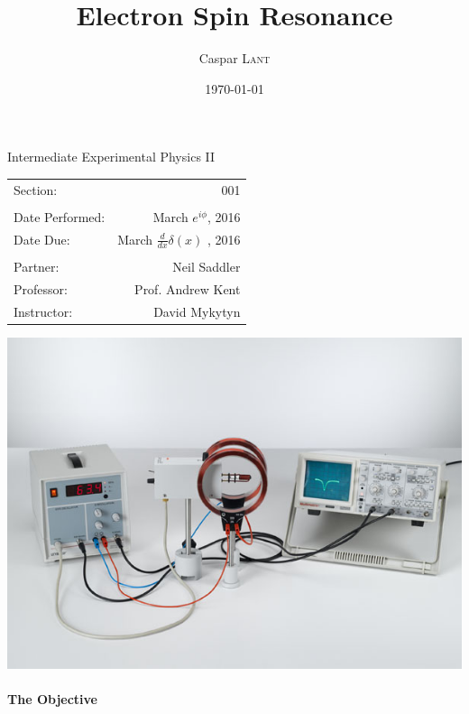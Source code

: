\documentclass{amsart}
\title{Electron Spin Resonance}
\author{Caspar \textsc{Lant}} %
\date{\today} %
\begin{document}
\bigskip

\maketitle %
\begin{center}

Intermediate Experimental Physics II\\
\vspace{1.5cm}

\begin{tabular}{l r}

Section: & 001\\
\\
Date Performed: & March $e^{i\phi}$, 2016 \\ %
Date Due: & March $ \frac{d}{dx}\delta(x)$ , 2016\\
\\
Partner: & Neil Saddler\\ %
Professor: & Prof. Andrew Kent\\
Instructor: & David Mykytyn %
\end{tabular}
\vfill
\includegraphics[width=.7\textwidth]{diagram.jpg}
\end{center}
\vfill
\pagebreak
{}
\paragraph{\textbf{The Objective} }
\end{document}
